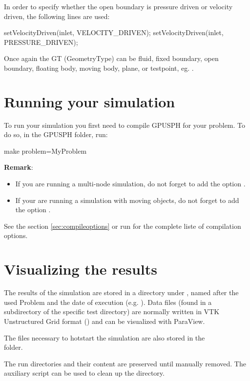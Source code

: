 In order to specify whether the open boundary is pressure driven or velocity driven, the following lines
are used:
\begin{shellcode}
setVelocityDriven(inlet, VELOCITY_DRIVEN);
setVelocityDriven(inlet, PRESSURE_DRIVEN);
\end{shellcode}

Once again the GT (GeometryType) can be fluid, fixed boundary, open boundary, 
floating body, moving body, plane, or testpoint, eg. . 

\section{Running your simulation}\label{sec:run}
To run your simulation you first need to compile GPUSPH for your problem.
To do so, in the GPUSPH folder, run:
\begin{shellcode}
make problem=MyProblem
\end{shellcode}
\textbf{Remark}:
\begin{itemize}
\item If you are running a multi-node simulation, do not forget to add the option
.
\item If your are running a simulation with moving objects, do not forget to add the
option .
\end{itemize}
See the section \ref{sec:compileoptions} or run  for the complete liste of compilation options.

\section{Visualizing the results}\label{sec:postprocess}

The results of the simulation are stored in a directory under
, named after the used Problem and the date of execution
(e.g. ). Data files (found in a
 subdirectory of the specific test directory) are normally
written in VTK Unstructured Grid format () and can be
visualized with ParaView.

The files necessary to hotstart the simulation are also stored
in the \\  folder.

The run directories and their content are preserved until manually
removed. The  auxiliary script can be used to clean
up the  directory.

